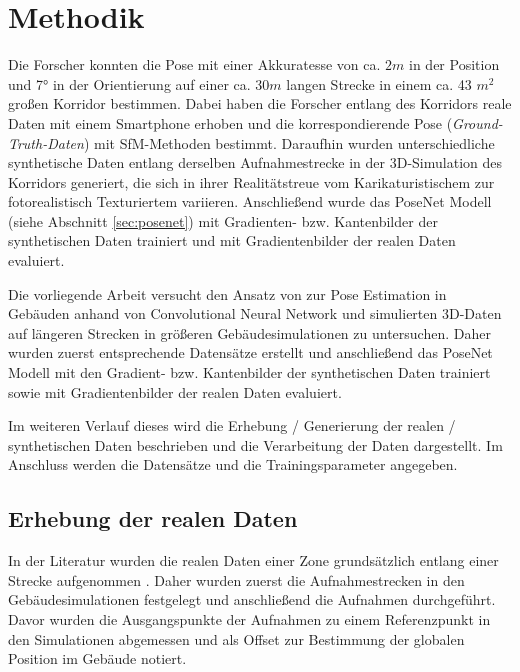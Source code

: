 
\section{Methodik}



Die Forscher \citet{acharyaBIMPoseNetIndoorCamera2019} konnten die Pose mit einer Akkuratesse von ca. $2m$ in der Position und 7° in der Orientierung auf einer ca. 30$m$ langen Strecke in einem ca. 43 $m^2$ großen Korridor bestimmen. Dabei haben die Forscher entlang des Korridors reale Daten mit einem Smartphone erhoben und die korrespondierende Pose (\textit{Ground-Truth-Daten}) mit SfM-Methoden bestimmt. Daraufhin wurden unterschiedliche synthetische Daten entlang derselben Aufnahmestrecke in der 3D-Simulation des Korridors generiert, die sich in ihrer Realitätstreue vom Karikaturistischem zur fotorealistisch Texturiertem variieren. Anschließend wurde das PoseNet Modell (siehe Abschnitt \ref{sec:posenet}) mit Gradienten- bzw. Kantenbilder der synthetischen Daten trainiert und mit Gradientenbilder der realen Daten evaluiert.



Die vorliegende Arbeit versucht den Ansatz von \citet{acharyaBIMPoseNetIndoorCamera2019} zur Pose Estimation in Gebäuden anhand von Convolutional Neural Network und simulierten 3D-Daten auf längeren Strecken in größeren Gebäudesimulationen zu untersuchen. Daher wurden zuerst entsprechende Datensätze erstellt und anschließend das PoseNet Modell mit den Gradient- bzw. Kantenbilder der synthetischen Daten trainiert sowie mit Gradientenbilder der realen Daten evaluiert.


Im weiteren Verlauf dieses wird die Erhebung / Generierung der realen / synthetischen Daten beschrieben und die Verarbeitung der Daten dargestellt. Im Anschluss werden die Datensätze und die Trainingsparameter angegeben. 

\subsection{Erhebung der realen Daten}
\label{subsec:record_real_data}
In der Literatur wurden die realen Daten einer Zone grundsätzlich entlang einer Strecke aufgenommen \cite{kendallPoseNetConvolutionalNetwork2015, clarkVidLocDeepSpatioTemporal2017, acharyaBIMPoseNetIndoorCamera2019}. Daher wurden zuerst die Aufnahmestrecken in den Gebäudesimulationen festgelegt und anschließend die Aufnahmen durchgeführt. Davor wurden die Ausgangspunkte der Aufnahmen zu einem Referenzpunkt in den Simulationen abgemessen und als Offset zur Bestimmung der globalen Position im Gebäude notiert.

